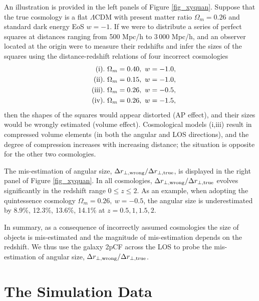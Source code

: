 \documentclass[iop]{emulateapj}
\begin{document}
An illustration is provided in the left panels of Figure \ref{fig_xyquan}.
Suppose that the true cosmology is a flat $\Lambda$CDM with present matter ratio $\Omega_m=0.26$
and standard dark energy EoS $w=-1$.
If we were to distribute a series of perfect squares at distances ranging from 500 Mpc/h to 3\,000 Mpc/h,
and an observer located at the origin were to measure their redshifts and infer the sizes of the squares
using the distance-redshift relations of four incorrect cosmologies
\begin{eqnarray}
 & &{\rm (i)}.\ \Omega_m=0.40,\ w=-1.0, \nonumber \\ 
 & &{\rm (ii)}.\ \Omega_m=0.15,\ w=-1.0, \nonumber\\ \noindent
 & &{\rm (iii)}.\ \Omega_m=0.26,\ w=-0.5,\nonumber\\ \noindent
 & &{\rm (iv)}.\ \Omega_m=0.26,\ w=-1.5,  \nonumber \noindent 
\end{eqnarray}
then the shapes of the squares would appear distorted (AP effect),
and their sizes would be wrongly estimated (volume effect).
Cosmological models (i,iii) result in compressed volume elements (in both the angular and LOS directions),
and the degree of compression increases with increasing distance;
the situation is opposite for the other two cosmologies.

The mis-estimation of angular size, ${\Delta r_{\perp, \rm wrong}}/{\Delta r_{\perp, \rm true}}$, 
is displayed in the right panel of Figure \ref{fig_xyquan}.
In all cosmologies, ${\Delta r_{\perp, \rm wrong}}/{\Delta r_{\perp, \rm true}}$ evolves significantly in the redshift range $0\leq z\leq 2$.
As an example, when adopting the quintessence cosmology $\Omega_m=0.26,\ w=-0.5$,
the angular size is underestimated by 
8.9\%, 12.3\%, 13.6\%, 14.1\% 
at $z=0.5,1,1.5,2$.


In summary, as a consequence of incorrectly assumed cosmologies 
the size of objects is mis-estimated and the magnitude of mis-estimation depends on the redshift.
We thus use the galaxy 2pCF across the LOS to probe the mis-estimation of angular size, ${\Delta r_{\perp, \rm wrong}}/{\Delta r_{\perp, \rm true}}$.


\section{The Simulation Data}\label{sec:data}
\end{document}
